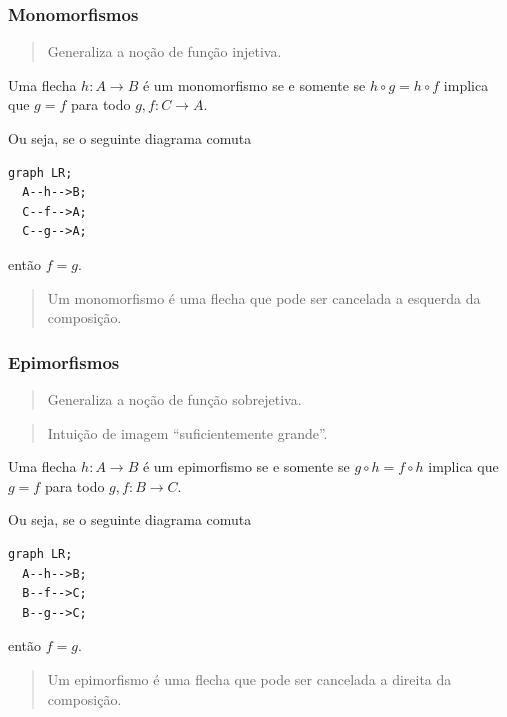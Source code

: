 \hypertarget{monomorfismos}{%
\subsubsection{Monomorfismos}\label{monomorfismos}}

\begin{quote}
Generaliza a noção de função injetiva.
\end{quote}

Uma flecha \(h : A \rightarrow B\) é um monomorfismo se e somente se
\(h \circ g = h \circ f\) implica que \(g = f\) para todo
\(g, f : C \rightarrow A\).

Ou seja, se o seguinte diagrama comuta

\begin{verbatim}
graph LR;
  A--h-->B;
  C--f-->A;
  C--g-->A;
\end{verbatim}

então \(f = g\).

\begin{quote}
Um monomorfismo é uma flecha que pode ser cancelada a esquerda da
composição.
\end{quote}

\hypertarget{epimorfismos}{%
\subsubsection{Epimorfismos}\label{epimorfismos}}

\begin{quote}
Generaliza a noção de função sobrejetiva.
\end{quote}

\begin{quote}
Intuição de imagem ``suficientemente grande''.
\end{quote}

Uma flecha \(h : A \rightarrow B\) é um epimorfismo se e somente se
\(g \circ h = f \circ h\) implica que \(g = f\) para todo
\(g, f : B \rightarrow C\).

Ou seja, se o seguinte diagrama comuta

\begin{verbatim}
graph LR;
  A--h-->B;
  B--f-->C;
  B--g-->C;
\end{verbatim}

então \(f = g\).

\begin{quote}
Um epimorfismo é uma flecha que pode ser cancelada a direita da
composição.
\end{quote}

